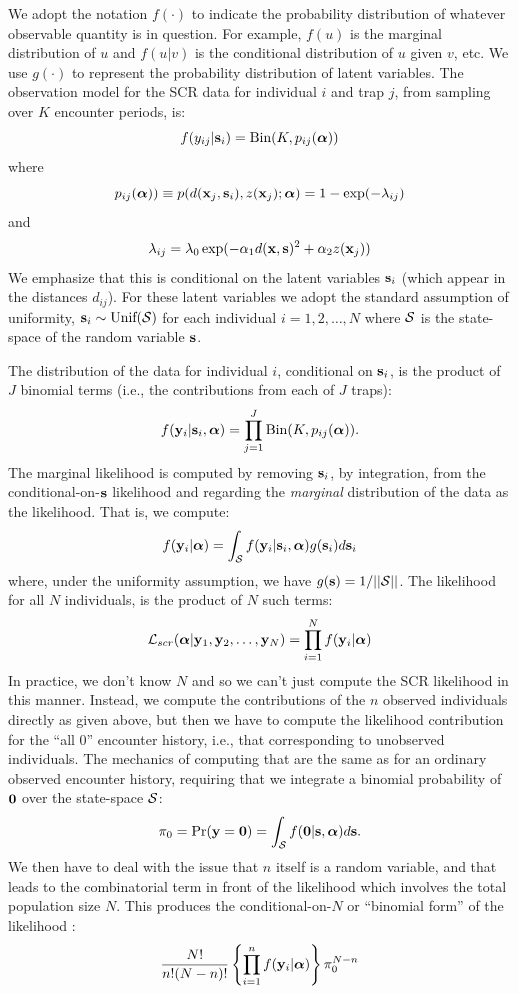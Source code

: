 \documentclass[12pt]{article}
\begin{document}
We adopt the notation $f(\cdot)$ to indicate the probability
distribution of whatever observable quantity is in question.
For example, $f(u)$ is
the marginal distribution of $u$ and $f(u|v)$ is the conditional
distribution of $u$ given $v$, etc. We use $g(\cdot)$ to represent the
probability distribution of latent variables.
The observation model for the SCR data for individual $i$ and trap $j$,
from sampling over $K$ encounter periods, is:
\begin{equation}
f(y_{ij}| {\bf s}_{i}) = \mbox{Bin}(K, p_{ij}({\bm \alpha}))
\label{rsf.mle.eq.cond-on-s}
\end{equation}
where
\[
p_{ij}({\bm \alpha})) \equiv  p(d({\bf x}_{j},{\bf s}_{i}), z({\bf x}_{j}); {\bm \alpha})
 = 1-\exp(- \lambda_{ij} )
\]
and
\[
 \lambda_{ij} = \lambda_{0} \exp(- \alpha_{1}
d({\bf x},{\bf s})^{2}
 + \alpha_{2} z({\bf x}_{j}) )
\]
We emphasize that this is conditional on the latent variables ${\bf
  s}_{i}$ (which appear in the distances $d_{ij}$). For these latent variables we
adopt the standard assumption of uniformity, ${\bf s}_{i} \sim
\mbox{Unif}({\cal S})$ for each individual $i=1,2,\ldots,N$
\citep{royle_young:2008} where ${\cal S}$ is the state-space of the
random variable ${\bf s}$.

The distribution of the data for
individual $i$, conditional on ${\bf s}_{i}$, is the product of $J$
binomial terms (i.e., the contributions from each of $J$ traps):
\[
  f({\bf y}_{i} | {\bf s}_{i} , {\bm \alpha}) =
  \prod_{j=1}^{J} \mbox{Bin}(K, p_{ij} ( {\bm \alpha})).
\]
The marginal likelihood \citep{borchers_efford:2008} is
computed by removing ${\bf s}_{i}$, by integration, from the
conditional-on-${\bf s}$ likelihood and regarding the {\it marginal}
distribution of the data as the likelihood. That is, we compute:
\[
  f({\bf y}_{i}|{\bm \alpha}) =
\int_{{\cal S}}  f( {\bf y}_{i} |{\bf s}_{i},{\bm \alpha}) g({\bf s}_{i}) d{\bf s}_{i}
\]
 where, under the uniformity assumption, we have
$g({\bf s}) = 1/||{\cal S}||$.
The likelihood for all $N$ individuals,
is the product of $N$ such terms:
\[
{\cal L}_{scr}({\bm \alpha} | {\bf y}_{1},{\bf y}_{2},\ldots, {\bf y}_{N}) = \prod_{i=1}^{N}
f({\bf y}_{i}|{\bm \alpha})
\]
In practice, we don't know $N$ and so we can't just compute the SCR
likelihood in this manner. Instead, we compute the contributions of
the $n$ observed individuals
directly as given above, but then we have
to compute the likelihood contribution for the ``all 0'' encounter
history, i.e., that corresponding to unobserved individuals.  The
mechanics of computing that are the same as for an ordinary observed
encounter history, requiring that we integrate a binomial probability
of ${\bf 0}$ over the state-space ${\cal S}$:
\[
\pi_{0} = \Pr({\bf y} = {\bf 0}) = \int_{{\cal S}}
  f({\bf 0} | {\bf s} , {\bm \alpha})  d{\bf s}.
\]
We
then have to deal with the issue that $n$
itself is a random variable,
and that leads to the combinatorial term in front of the likelihood
which involves the total population size $N$. This produces the
conditional-on-$N$ or ``binomial form'' of the likelihood
\citep{borchers_efford:2008,royle:2009}:
\[
\frac{N!}{n! (N-n)!}
\left\{ \prod_{i=1}^{n} f({\bf y}_{i}|{\bm \alpha}) \right\}
\pi_{0}^{N-n}
\]
\end{document}
